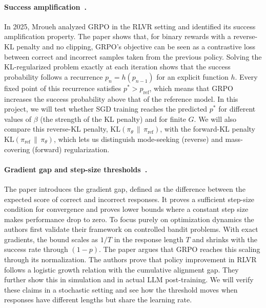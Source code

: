 \documentclass{article}
\theoremstyle{definition}
\newcommand{\1}{\mathbf{1}}
\newcommand{\KL}{\mathrm{KL}}
\newcommand{\pref}{p_{\mathrm{ref}}}
\newcommand{\piref}{\pi_{\mathrm{ref}}}
\begin{document}
\paragraph{Success amplification~\citep{mroueh2025rlvr}.}
In 2025, Mroueh analyzed GRPO in the RLVR setting and identified its success
amplification property. The paper shows that, for binary rewards with a reverse-KL
penalty and no clipping, GRPO's objective can be seen as a contrastive loss between
correct and incorrect samples taken from the previous policy. Solving the
KL-regularized problem exactly at each iteration shows that the success probability
follows a recurrence $p_n = h(p_{n-1})$ for an explicit function $h$. Every fixed point
of this recurrence satisfies $p^\ast > \pref$, which means that GRPO increases the
success probability above that of the reference model. In this project, we will test
whether SGD training reaches the predicted $p^\ast$ for different values of $\beta$
(the strength of the KL penalty) and for finite $G$. We will also compare this
reverse-KL penalty, $\KL(\pi_\theta \,\|\, \piref)$, with the forward-KL penalty
$\KL(\piref \,\|\, \pi_\theta)$, which lets us distinguish mode-seeking (reverse) and
mass-covering (forward) regularization.

\paragraph{Gradient gap and step-size thresholds~\citep{suk2025gradientgap}.}
The paper introduces the gradient gap, defined as the difference between the expected
score of correct and incorrect responses. It proves a sufficient step-size condition for
convergence and proves lower bounds where a constant step size makes performance
drop to zero. To focus purely on optimization dynamics the authors first validate their framework on controlled bandit problems.
With exact gradients, the bound scales as $1/T$ in the response
length $T$ and shrinks with the success rate through $(1-p)$. The paper argues
that GRPO reaches this scaling through its normalization. 
The authors prove that policy improvement in RLVR follows a logistic growth relation with the cumulative alignment gap.
They further show this in simulation and in actual LLM post-training.
We will verify these claims in a stochastic setting and see how the threshold moves when responses
have different lengths but share the learning rate.
\end{document}
